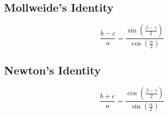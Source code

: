 \documentclass{article}
\begin{document}
\subsection{Mollweide's Identity}
\begin{equation*}
	\frac{b-c}{a}=\frac{\sin{\left( \frac{\beta-\gamma}{2} \right)}}{\cos{\left( \frac{\alpha}{2} \right)}}
\end{equation*}
\subsection{Newton's Identity}
\begin{equation*}
	\frac{b+c}{a}=\frac{\cos{\left( \frac{\beta-\gamma}{2} \right)}}{\sin{\left( \frac{\alpha}{2} \right)}}
\end{equation*}
\end{document}
